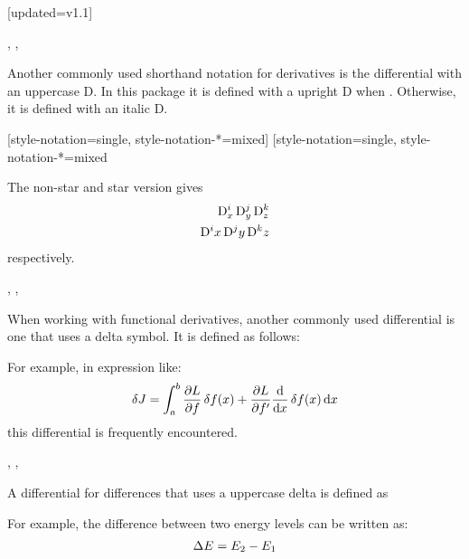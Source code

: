 \begin{function}{\mdif}[updated=v1.1]
	\begin{syntax}
		\sarg, , 
	\end{syntax}
	Another commonly used shorthand notation for derivatives is the differential with an uppercase D. In this package it is defined with a upright D when . Otherwise, it is defined with an italic D.
	\begin{definition}
		[style-notation=single,
		style-notation-*=mixed]%
		[style-notation=single,
		style-notation-*=mixed%
	\end{definition}
	
	\noindent The non-star and star version gives
	\begin{align*}
		\mdif[order={i,j,k}]{x,y,z} \\
		\mdif*[order={i,j,k}]{x,y,z}
	\end{align*}
	respectively.
\end{function}

\begin{function}{\fdif}
	\begin{syntax}
		\sarg, , \marg{variables}
	\end{syntax}
	When working with functional derivatives, another commonly used differential is one that uses a delta symbol. It is defined as follows:
	\begin{definition}
		\DeclareDifferential{\fdif}{\delta}
	\end{definition}
	
	\noindent For example, in expression like:
	\begin{align*}
		\fdif{J} = \int_{a}^{b} \pdv{L}{f} \fdif{f(x)} + \pdv{L}{f'} \odv*{ \fdif{f(x)} }{x} \odif{x}
	\end{align*}
	this differential is frequently encountered.
\end{function}

\begin{function}{\adif}
	\begin{syntax}
		\sarg, , 
	\end{syntax}
	A differential for differences that uses a uppercase delta is defined as
	\begin{definition}
		\DeclareDifferential{\adif}{\Delta}
	\end{definition}
	
	\noindent For example, the difference between two energy levels can be written as:
	\begin{align*}
		\adif{E} = E_2 - E_1
	\end{align*}
\end{function}
	

